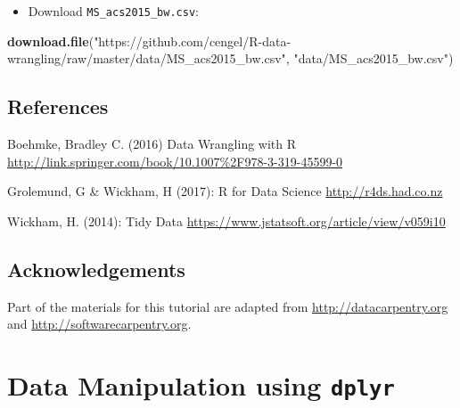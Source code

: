 \documentclass[]{book}
\newenvironment{Shaded}{\begin{snugshade}}{\end{snugshade}}
\newcommand{\KeywordTok}[1]{\textcolor[rgb]{0.13,0.29,0.53}{\textbf{#1}}}
\newcommand{\StringTok}[1]{\textcolor[rgb]{0.31,0.60,0.02}{#1}}
\newcommand{\NormalTok}[1]{#1}
\providecommand{\tightlist}{%
  \setlength{\itemsep}{0pt}\setlength{\parskip}{0pt}}
\theoremstyle{definition}
\theoremstyle{definition}
\theoremstyle{definition}
\theoremstyle{remark}
\begin{document}
\begin{itemize}
\tightlist
\item
  Download \texttt{MS\_acs2015\_bw.csv}:
\end{itemize}

\begin{Shaded}
\begin{Highlighting}[]
\KeywordTok{download.file}\NormalTok{(}\StringTok{"https://github.com/cengel/R-data-wrangling/raw/master/data/MS_acs2015_bw.csv"}\NormalTok{,}
              \StringTok{"data/MS_acs2015_bw.csv"}\NormalTok{)}
\end{Highlighting}
\end{Shaded}

\section*{References}\label{references}

Boehmke, Bradley C. (2016) Data Wrangling with R
\url{http://link.springer.com/book/10.1007\%2F978-3-319-45599-0}

Grolemund, G \& Wickham, H (2017): R for Data Science
\url{http://r4ds.had.co.nz}

Wickham, H. (2014): Tidy Data
\url{https://www.jstatsoft.org/article/view/v059i10}

\section*{Acknowledgements}\label{acknowledgements}

Part of the materials for this tutorial are adapted from
\url{http://datacarpentry.org} and \url{http://softwarecarpentry.org}.

\chapter{\texorpdfstring{Data Manipulation using
\textbf{\texttt{dplyr}}}{Data Manipulation using dplyr}}\label{dplyr}
\end{document}
